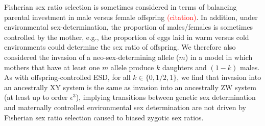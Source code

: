 \documentclass[12pt]{article}
\begin{document}


Fisherian sex ratio selection is sometimes considered in terms of balancing parental investment in male versus female offspring \textcolor{red}{(citation)}. 
In addition, under environmental sex-determination, the proportion of males/females is sometimes controlled by the mother, e.g., the proportion of eggs laid in warm versus cold environments could determine the sex ratio of offspring. 
We therefore also considered the invasion of a neo-sex-determining allele ($m$) in a model in which mothers that have at least one $m$ allele produce $k$ daughters and $(1-k)$ males. 
As with offspring-controlled ESD, for all $k\in\{0,1/2,1\}$, we find that invasion into an ancestrally XY system is the same as invasion into an ancestrally ZW system (at least up to order $\epsilon^3$), implying transitions between genetic sex determination and maternally controlled environmental sex determination are not driven by Fisherian sex ratio selection caused to biased zygotic sex ratios.
\end{document}
